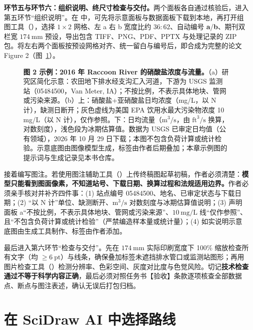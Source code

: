 \textbf{环节五与环节六：组织说明、终尺寸检查与交付。}两个面板各自通过核验后，进入第五环节“组织说明”。在 \scidraw{} 中，可先将示意面板与数据面板下载到本地，再打开组图工具（），选择 $1 \times 2$ 网格、左 a 右 b 宽度比约 $36:62$、自动编号 \textbf{a}/\textbf{b}、期刊双栏宽 $174\ \text{mm}$ 预设，导出包含 TIFF、PNG、PDF、PPTX 与处理记录的 ZIP 包。将左右两个面板按预设网格对齐、统一留白与编号后，即合成为完整的论文 Figure 2（图~\ref{fig:ch01-07}）。

\begin{figure}[htbp]\centering
{}
\caption{\textbf{图 2 示例：2016 年 Raccoon River 的硝酸盐浓度与流量。}（a）研究区简化示意：农田地下排水经支沟汇入河道，下游为 USGS 监测站（05484500，Van Meter, IA）；不按比例，不表示具体地块、管网或污染来源。（b）上：硝酸盐+亚硝酸盐日均浓度（mg/L，以 N 计），缺测日断开；灰色虚线为美国 EPA 饮用水最大污染物浓度 10 mg/L（以 N 计），仅作参照。下：日均流量（$\text{m}^3/\text{s}$，由 $\text{ft}^3/\text{s}$ 换算，对数刻度），浅色段为冰期估算值。数据为 USGS 已审定日均值（公有领域），2026 年 10 月 29 日下载；本图不包含负荷计算或统计检验。示意底图由图像模型生成，标签由作者后期叠加；本章示例图的提示词与生成记录见本书仓库。}\label{fig:ch01-07}
\end{figure}

接着编写图注。若使用图注辅助工具（）上传终稿图起草初稿，作者必须清楚：\textbf{模型只能看到图面像素，不知道站号、下载日期、换算过程和法规适用边界。}作者必须亲手核对并补齐四件事：(1) 站点编号 05484500、地名、已审定状态与下载日期；(2) “以 N 计”单位、缺测断开、$\text{m}^3/\text{s}$ 对数刻度与冰期估算值说明；(3) 声明面板 a“不按比例，不表示具体地块、管网或污染来源”、$10\ \text{mg/L}$ 线“仅作参照”、且“不包含负荷计算或统计检验”（严禁编造样本量或统计量）；(4) 如实说明示意底图由生成工具制作、标签由作者添加。

最后进入第六环节“检查与交付”。先在 $174\ \text{mm}$ 实际印刷宽度下 100\% 缩放检查所有文字（均 $\ge 6\ \text{pt}$）与线条，确保叠加标签未遮挡排水管口或监测站图形；再用图片检查工具（）检测分辨率、色彩空间、灰度对比度与色觉风险。切记\textbf{技术检查通过不等于科学内容正确}，最后必须对照任务书【验收】条款逐项核查全部数据点、断点与图注表述，确认无误后打包归档。

\section{在 SciDraw AI 中选择路线}

